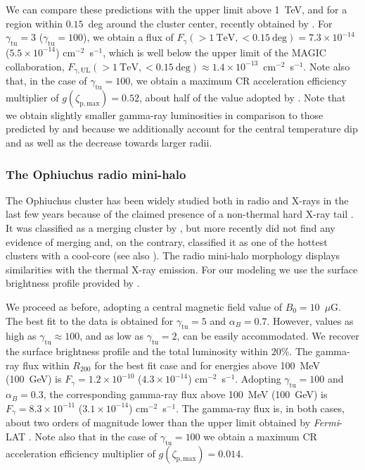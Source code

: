 \documentclass[traditabstract]{aa}
\newcommand{\rmn}{\mathrm}
\begin{document}
We can compare these predictions with the upper limit above 1~TeV, and for a
region within $0.15$~deg around the cluster center, recently obtained by
\cite{2011arXiv1111.5544M}. For $\gamma_{\rmn{tu}}=3$ ($\gamma_{\rmn{tu}}=100$),
we obtain a flux of $F_{\gamma}(>1~\rmn{TeV},<0.15~\rmn{deg}) = 7.3 \times
10^{-14}$ ($5.5 \times 10^{-14}$) cm$^{-2}$~s$^{-1}$, which is well below the
upper limit of the MAGIC collaboration,
$F_{\gamma,\rmn{UL}}(>1~\rmn{TeV},<0.15~\rmn{deg}) \approx 1.4 \times
10^{-13}$~cm$^{-2}$~s$^{-1}$. Note also that, in the case of $\gamma_{\rmn{tu}}
= 100$, we obtain a maximum CR acceleration efficiency multiplier of
$g(\zeta_{\rmn{p,max}})=0.52$, about half of the value adopted by
\cite{2010MNRAS.409..449P}. Note that we obtain slightly smaller gamma-ray
luminosities in comparison to those predicted by \cite{2010MNRAS.409..449P}
and \cite{2011arXiv1105.3240P} because we additionally account for the
central temperature dip and as well as the decrease towards larger radii.


\subsubsection{The Ophiuchus radio mini-halo}

The Ophiuchus cluster has been widely studied both in radio and X-rays in the
last few years because of the claimed presence of a non-thermal hard X-ray tail
\citep{2008A&A...479...27E,2008PASJ...60.1133F,2009A&A...499..371G,
  2009A&A...499..679M,2009MNRAS.396.2237P,2009A&A...508.1161N,2010A&A...514A..76M,
  2010MNRAS.405.1624M}.  It was classified as a merging cluster by
\cite{2001PASJ...53..605W}, but more recently \cite{2008PASJ...60.1133F} did not
find any evidence of merging and, on the contrary, classified it as one of the
hottest clusters with a cool-core (see also \citealp{2010MNRAS.405.1624M}). The
radio mini-halo morphology displays similarities with the thermal X-ray
emission. For our modeling we use the surface brightness profile provided by
\cite{2009A&A...499..679M}.  

We proceed as before, adopting a central magnetic field value of
$B_{0}=10$~$\mu$G. The best fit to the data is obtained for
$\gamma_{\rmn{tu}}=5$ and $\alpha_B=0.7$. However, values as high as
$\gamma_{\rmn{tu}} \approx 100$, and as low as $\gamma_{\rmn{tu}}=2$, can be
easily accommodated. We recover the surface brightness profile and the total
luminosity within $20\%$. The gamma-ray flux within $R_{200}$ for the best
fit case and for energies above 100~MeV (100~GeV) is $F_{\gamma} = 1.2 \times
10^{-10}$ ($4.3 \times 10^{-14}$) cm$^{-2}$~s$^{-1}$. Adopting
$\gamma_{\rmn{tu}}=100$ and $\alpha_B=0.3$, the corresponding gamma-ray flux
above 100~MeV (100~GeV) is $F_{\gamma} = 8.3 \times 10^{-11}$ ($3.1 \times
10^{-14}$) cm$^{-2}$~s$^{-1}$. The gamma-ray flux is, in both cases, about two
orders of magnitude lower than the upper limit obtained by \emph{Fermi}-LAT
\citep{2010ApJ...717L..71A}. Note also that in the case of $\gamma_{\rmn{tu}} =
100$ we obtain a maximum CR acceleration efficiency multiplier of
$g(\zeta_{\rmn{p,max}})=0.014$.
\end{document}
